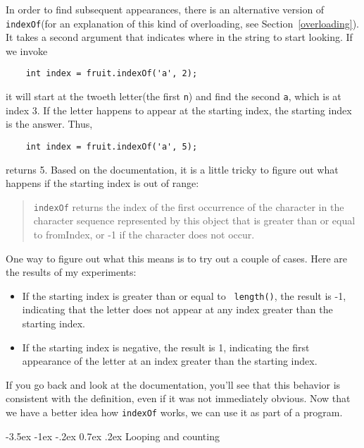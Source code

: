 \documentclass{book}
\makeatletter
\renewcommand{\section}{\@startsection 
    {section} {1} {0mm}%
    {-3.5ex \@plus -1ex \@minus -.2ex}%
    {0.7ex \@plus.2ex}%
    {\normalfont\Large\bfseries}}
\makeatother
\begin{document}
In order to find subsequent appearances, there is an alternative
version of {\tt indexOf}(for an explanation of this kind
of overloading, see Section~\ref{overloading}).  It takes a
second argument that indicates where in the string to start
looking.  If we invoke

\begin{verbatim}
    int index = fruit.indexOf('a', 2);
\end{verbatim}
%
it will start at the twoeth letter(the first {\tt n}) and find
the second {\tt a}, which is at index 3.  If the letter happens
to appear at the starting index, the starting index is the
answer.  Thus,

\begin{verbatim}
    int index = fruit.indexOf('a', 5);
\end{verbatim}
%
returns 5.  Based on the documentation, it is a little tricky
to figure out what happens if the starting index is out
of range:

\begin{quote}
{\tt indexOf} returns the index of the first occurrence of the
character in the character sequence represented by this object that is
greater than or equal to fromIndex, or -1 if the character does not
occur.
\end{quote}

One way to figure out what this means is to try out a couple
of cases.  Here are the results of my experiments:

\begin{itemize}

\item If the starting index is greater than or equal to {\tt
length()}, the result is -1, indicating that the letter
does not appear at any index greater than the starting index.

\item If the starting index is negative, the result is 1,
indicating the first appearance of the letter at an index
greater than the starting index.

\end{itemize}

If you go back and look at the documentation, you'll see that
this behavior is consistent with the definition, even if it
was not immediately obvious.  Now that we have a better idea
how {\tt indexOf} works, we can use it as part of a program.

\section{Looping and counting}
\label{loopcount}
\end{document}
